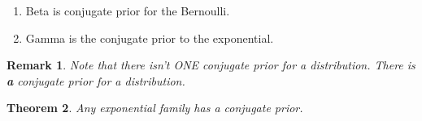 \documentclass[twoside]{article}
\newcounter{lecnum}
\newtheorem{theorem}{Theorem}[lecnum]
\newtheorem{remark}[theorem]{Remark}
\begin{document}
\begin{enumerate}
\item Beta is conjugate prior for the Bernoulli.
\item Gamma is the conjugate prior to the exponential.
\end{enumerate}

\begin{remark}
Note that there isn't ONE conjugate prior for a distribution. There is \textbf{a} conjugate prior for a distribution.
\end{remark}

\begin{theorem}Any exponential family has a conjugate prior.
\end{theorem}
\end{document}
